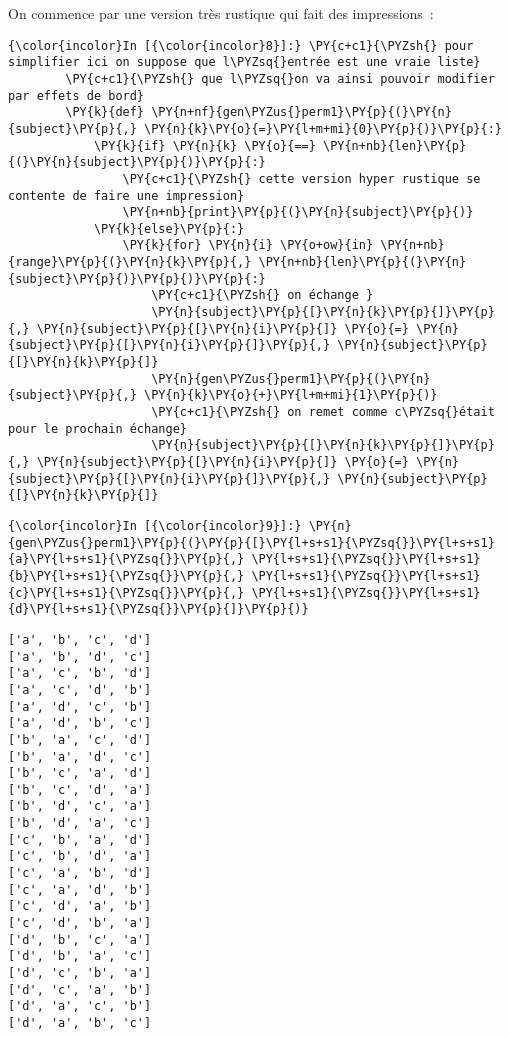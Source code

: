     On commence par une version très rustique qui fait des impressions~:

    \begin{Verbatim}[commandchars=\\\{\}]
{\color{incolor}In [{\color{incolor}8}]:} \PY{c+c1}{\PYZsh{} pour simplifier ici on suppose que l\PYZsq{}entrée est une vraie liste}
        \PY{c+c1}{\PYZsh{} que l\PYZsq{}on va ainsi pouvoir modifier par effets de bord}
        \PY{k}{def} \PY{n+nf}{gen\PYZus{}perm1}\PY{p}{(}\PY{n}{subject}\PY{p}{,} \PY{n}{k}\PY{o}{=}\PY{l+m+mi}{0}\PY{p}{)}\PY{p}{:}
            \PY{k}{if} \PY{n}{k} \PY{o}{==} \PY{n+nb}{len}\PY{p}{(}\PY{n}{subject}\PY{p}{)}\PY{p}{:}
                \PY{c+c1}{\PYZsh{} cette version hyper rustique se contente de faire une impression}
                \PY{n+nb}{print}\PY{p}{(}\PY{n}{subject}\PY{p}{)}
            \PY{k}{else}\PY{p}{:}
                \PY{k}{for} \PY{n}{i} \PY{o+ow}{in} \PY{n+nb}{range}\PY{p}{(}\PY{n}{k}\PY{p}{,} \PY{n+nb}{len}\PY{p}{(}\PY{n}{subject}\PY{p}{)}\PY{p}{)}\PY{p}{:}
                    \PY{c+c1}{\PYZsh{} on échange }
                    \PY{n}{subject}\PY{p}{[}\PY{n}{k}\PY{p}{]}\PY{p}{,} \PY{n}{subject}\PY{p}{[}\PY{n}{i}\PY{p}{]} \PY{o}{=} \PY{n}{subject}\PY{p}{[}\PY{n}{i}\PY{p}{]}\PY{p}{,} \PY{n}{subject}\PY{p}{[}\PY{n}{k}\PY{p}{]}
                    \PY{n}{gen\PYZus{}perm1}\PY{p}{(}\PY{n}{subject}\PY{p}{,} \PY{n}{k}\PY{o}{+}\PY{l+m+mi}{1}\PY{p}{)}
                    \PY{c+c1}{\PYZsh{} on remet comme c\PYZsq{}était pour le prochain échange}
                    \PY{n}{subject}\PY{p}{[}\PY{n}{k}\PY{p}{]}\PY{p}{,} \PY{n}{subject}\PY{p}{[}\PY{n}{i}\PY{p}{]} \PY{o}{=} \PY{n}{subject}\PY{p}{[}\PY{n}{i}\PY{p}{]}\PY{p}{,} \PY{n}{subject}\PY{p}{[}\PY{n}{k}\PY{p}{]}
\end{Verbatim}


    \begin{Verbatim}[commandchars=\\\{\}]
{\color{incolor}In [{\color{incolor}9}]:} \PY{n}{gen\PYZus{}perm1}\PY{p}{(}\PY{p}{[}\PY{l+s+s1}{\PYZsq{}}\PY{l+s+s1}{a}\PY{l+s+s1}{\PYZsq{}}\PY{p}{,} \PY{l+s+s1}{\PYZsq{}}\PY{l+s+s1}{b}\PY{l+s+s1}{\PYZsq{}}\PY{p}{,} \PY{l+s+s1}{\PYZsq{}}\PY{l+s+s1}{c}\PY{l+s+s1}{\PYZsq{}}\PY{p}{,} \PY{l+s+s1}{\PYZsq{}}\PY{l+s+s1}{d}\PY{l+s+s1}{\PYZsq{}}\PY{p}{]}\PY{p}{)}
\end{Verbatim}


    \begin{Verbatim}[commandchars=\\\{\}]
['a', 'b', 'c', 'd']
['a', 'b', 'd', 'c']
['a', 'c', 'b', 'd']
['a', 'c', 'd', 'b']
['a', 'd', 'c', 'b']
['a', 'd', 'b', 'c']
['b', 'a', 'c', 'd']
['b', 'a', 'd', 'c']
['b', 'c', 'a', 'd']
['b', 'c', 'd', 'a']
['b', 'd', 'c', 'a']
['b', 'd', 'a', 'c']
['c', 'b', 'a', 'd']
['c', 'b', 'd', 'a']
['c', 'a', 'b', 'd']
['c', 'a', 'd', 'b']
['c', 'd', 'a', 'b']
['c', 'd', 'b', 'a']
['d', 'b', 'c', 'a']
['d', 'b', 'a', 'c']
['d', 'c', 'b', 'a']
['d', 'c', 'a', 'b']
['d', 'a', 'c', 'b']
['d', 'a', 'b', 'c']

    \end{Verbatim}

